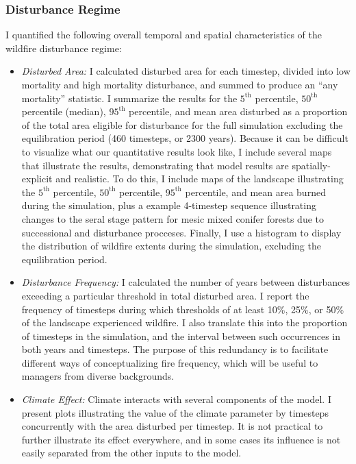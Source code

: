 \subsubsection{Disturbance Regime} I quantified the following overall temporal and spatial characteristics of the wildfire disturbance regime:
\begin{itemize}
	\item \emph{Disturbed Area:} I calculated disturbed area for each timestep, divided into low mortality and high mortality disturbance, and summed to produce an ``any mortality'' statistic. I summarize the results for the $5^{\text{th}}$ percentile, $50^{\text{th}}$ percentile (median), $95^{\text{th}}$ percentile, and mean area disturbed as a proportion of the total area eligible for disturbance for the full simulation excluding the equilibration period (460 timesteps, or 2300 years). Because it can be difficult to visualize what our quantitative results look like, I include several maps that illustrate the results, demonstrating that model results are spatially-explicit and realistic. To do this, I include maps of the landscape illustrating the $5^{\text{th}}$ percentile, $50^{\text{th}}$ percentile, $95^{\text{th}}$ percentile, and mean area burned during the simulation, plus a example 4-timestep sequence illustrating changes to the seral stage pattern for mesic mixed conifer forests due to successional and disturbance procceses. Finally, I use a histogram to display the distribution of wildfire extents during the simulation, excluding the equilibration period.
	\item \emph{Disturbance Frequency:} I calculated the number of years between disturbances exceeding a particular threshold in total disturbed area. I report the frequency of timesteps during which thresholds of at least 10\%, 25\%, or 50\% of the landscape experienced wildfire. I also translate this into the proportion of timesteps in the simulation, and the interval between such occurrences in both years and timesteps. The purpose of this redundancy is to facilitate different ways of conceptualizing fire frequency, which will be useful to managers from diverse backgrounds.
	\item \emph{Climate Effect:} Climate interacts with several components of the model. I present plots illustrating the value of the climate parameter by timesteps concurrently with the area disturbed per timestep. It is not practical to further illustrate its effect everywhere, and in some cases its influence is not easily separated from the other inputs to the model. 

\end{itemize}
